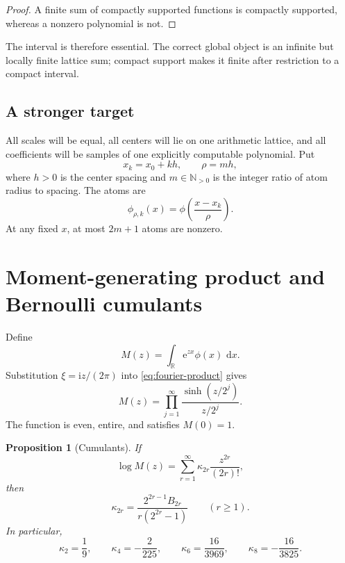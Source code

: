 \documentclass[11pt,oneside]{article}
\newtheorem{proposition}[theorem]{Proposition}
\theoremstyle{definition}
\theoremstyle{remark}
\newcommand{\R}{\mathbb R}
\newcommand{\N}{\mathbb N}
\newcommand{\dd}{\,\mathrm d}
\newcommand{\e}{\mathrm e}
\newcommand{\ii}{\mathrm i}
\begin{document}
\begin{proof}
A finite sum of compactly supported functions is compactly supported, whereas a
nonzero polynomial is not.
\end{proof}

The interval is therefore essential.  The correct global object is an infinite
but locally finite lattice sum; compact support makes it finite after
restriction to a compact interval.

\subsection{A stronger target}

All scales will be equal, all centers will lie on one arithmetic lattice, and
all coefficients will be samples of one explicitly computable polynomial.  Put
\[
 x_k=x_0+kh,\qquad \rho=mh,
\]
where \(h>0\) is the center spacing and \(m\in\N_{>0}\) is the integer ratio of
atom radius to spacing.  The atoms are
\[
 \phi_{\rho,k}(x)=\phi\!\left(\frac{x-x_k}{\rho}\right).
\]
At any fixed \(x\), at most \(2m+1\) atoms are nonzero.

\section{Moment-generating product and Bernoulli cumulants}
\label{sec:mgf}

Define
\begin{equation}
 M(z)=\int_\R\e^{zx}\phi(x)\,\dd x.
 \label{eq:M-def}
\end{equation}
Substitution \(\xi=\ii z/(2\pi)\) into \eqref{eq:fourier-product} gives
\begin{equation}
 M(z)=\prod_{j=1}^{\infty}\frac{\sinh(z/2^j)}{z/2^j}.
 \label{eq:M-product}
\end{equation}
The function is even, entire, and satisfies \(M(0)=1\).

\begin{proposition}[Cumulants]
\label{prop:cumulants}
If
\[
 \log M(z)=\sum_{r=1}^{\infty}\kappa_{2r}\frac{z^{2r}}{(2r)!},
\]
then
\begin{equation}
 \boxed{\displaystyle
 \kappa_{2r}=\frac{2^{2r-1}B_{2r}}{r(2^{2r}-1)}}
 \qquad(r\ge1).
 \label{eq:kappa}
\end{equation}
In particular,
\[
 \kappa_2=\frac19,\qquad
 \kappa_4=-\frac{2}{225},\qquad
 \kappa_6=\frac{16}{3969},\qquad
 \kappa_8=-\frac{16}{3825}.
\]
\end{proposition}
\end{document}
